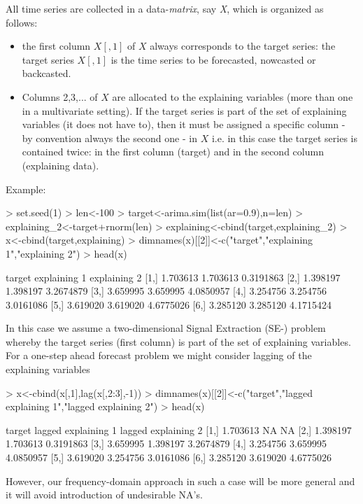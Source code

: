 \documentclass[a4paper]{book}
\begin{document}
All time series are collected in a data-\emph{matrix}, say \emph{X}, which is organized as follows: 
\begin{itemize}
\item the first column $X[,1]$ of $X$ always corresponds to the target series: the target series $X[,1]$ is the time series to be forecasted, nowcasted or backcasted.
\item Columns 2,3,... of $X$ are allocated to the explaining variables (more than one in a multivariate setting). If the target series is part of the set of explaining variables (it does not have to), then it must be assigned a specific column - by convention always the second one - in $X$ i.e. in this case the target series is contained twice: in the first column (target) and in the second column (explaining data).     
\end{itemize}
Example:
\begin{Schunk}
\begin{Sinput}
> set.seed(1)
> len<-100
> target<-arima.sim(list(ar=0.9),n=len)
> explaining_2<-target+rnorm(len)
> explaining<-cbind(target,explaining_2)
> x<-cbind(target,explaining)
> dimnames(x)[[2]]<-c("target","explaining 1","explaining 2")
> head(x)
\end{Sinput}
\begin{Soutput}
       target explaining 1 explaining 2
[1,] 1.703613     1.703613    0.3191863
[2,] 1.398197     1.398197    3.2674879
[3,] 3.659995     3.659995    4.0850957
[4,] 3.254756     3.254756    3.0161086
[5,] 3.619020     3.619020    4.6775026
[6,] 3.285120     3.285120    4.1715424
\end{Soutput}
\end{Schunk}
In this case we assume a two-dimensional Signal Extraction (SE-) problem whereby the target series (first column) is part of the set of explaining variables. For a one-step ahead forecast problem we might consider lagging of the explaining variables
\begin{Schunk}
\begin{Sinput}
> x<-cbind(x[,1],lag(x[,2:3],-1))
> dimnames(x)[[2]]<-c("target","lagged explaining 1","lagged explaining 2")
> head(x)
\end{Sinput}
\begin{Soutput}
       target lagged explaining 1 lagged explaining 2
[1,] 1.703613                  NA                  NA
[2,] 1.398197            1.703613           0.3191863
[3,] 3.659995            1.398197           3.2674879
[4,] 3.254756            3.659995           4.0850957
[5,] 3.619020            3.254756           3.0161086
[6,] 3.285120            3.619020           4.6775026
\end{Soutput}
\end{Schunk}
However, our frequency-domain approach in such a case will be more general and it will avoid introduction of undesirable NA's.
\end{document}
